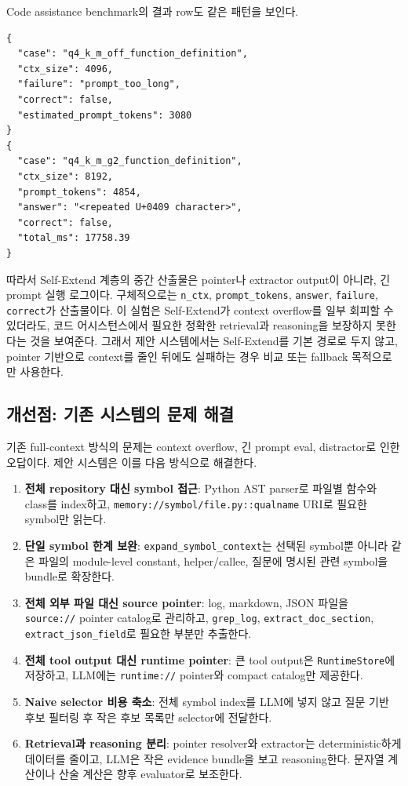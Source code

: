 \documentclass[11pt,a4paper]{article}
\begin{document}
Code assistance benchmark의 결과 row도 같은 패턴을 보인다.

\begin{lstlisting}
{
  "case": "q4_k_m_off_function_definition",
  "ctx_size": 4096,
  "failure": "prompt_too_long",
  "correct": false,
  "estimated_prompt_tokens": 3080
}
{
  "case": "q4_k_m_g2_function_definition",
  "ctx_size": 8192,
  "prompt_tokens": 4854,
  "answer": "<repeated U+0409 character>",
  "correct": false,
  "total_ms": 17758.39
}
\end{lstlisting}

따라서 Self-Extend 계층의 중간 산출물은 pointer나 extractor output이 아니라, 긴 prompt 실행 로그이다. 구체적으로는 \texttt{n\_ctx}, \texttt{prompt\_tokens}, \texttt{answer}, \texttt{failure}, \texttt{correct}가 산출물이다. 이 실험은 Self-Extend가 context overflow를 일부 회피할 수 있더라도, 코드 어시스턴스에서 필요한 정확한 retrieval과 reasoning을 보장하지 못한다는 것을 보여준다. 그래서 제안 시스템에서는 Self-Extend를 기본 경로로 두지 않고, pointer 기반으로 context를 줄인 뒤에도 실패하는 경우 비교 또는 fallback 목적으로만 사용한다.

\subsection{개선점: 기존 시스템의 문제 해결}

기존 full-context 방식의 문제는 context overflow, 긴 prompt eval, distractor로 인한 오답이다. 제안 시스템은 이를 다음 방식으로 해결한다.

\begin{enumerate}
  \item \textbf{전체 repository 대신 symbol 접근}: Python AST parser로 파일별 함수와 class를 index하고, \texttt{memory://symbol/file.py::qualname} URI로 필요한 symbol만 읽는다.
  \item \textbf{단일 symbol 한계 보완}: \texttt{expand\_symbol\_context}는 선택된 symbol뿐 아니라 같은 파일의 module-level constant, helper/callee, 질문에 명시된 관련 symbol을 bundle로 확장한다.
  \item \textbf{전체 외부 파일 대신 source pointer}: log, markdown, JSON 파일을 \texttt{source://} pointer catalog로 관리하고, \texttt{grep\_log}, \texttt{extract\_doc\_section}, \texttt{extract\_json\_field}로 필요한 부분만 추출한다.
  \item \textbf{전체 tool output 대신 runtime pointer}: 큰 tool output은 \texttt{RuntimeStore}에 저장하고, LLM에는 \texttt{runtime://} pointer와 compact catalog만 제공한다.
  \item \textbf{Naive selector 비용 축소}: 전체 symbol index를 LLM에 넣지 않고 질문 기반 후보 필터링 후 작은 후보 목록만 selector에 전달한다.
  \item \textbf{Retrieval과 reasoning 분리}: pointer resolver와 extractor는 deterministic하게 데이터를 줄이고, LLM은 작은 evidence bundle을 보고 reasoning한다. 문자열 계산이나 산술 계산은 향후 evaluator로 보조한다.
\end{enumerate}
\end{document}
